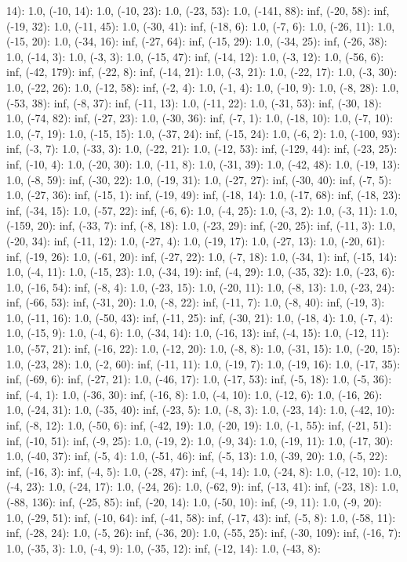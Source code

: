 \documentclass[parskip=half]{scrartcl}
\begin{document}
14): 1.0, (-10, 14): 1.0, (-10, 23): 1.0, (-23, 53): 1.0, (-141, 88): inf, (-20, 58): inf, (-19, 32): 1.0, (-11, 45): 1.0, (-30, 41): inf, (-18, 6): 1.0, (-7, 6): 1.0, (-26, 11): 1.0, (-15, 20): 1.0, (-34, 16): inf, (-27, 64): inf, (-15, 29): 1.0, (-34, 25): inf, (-26, 38): 1.0, (-14, 3): 1.0, (-3, 3): 1.0, (-15, 47): inf, (-14, 12): 1.0, (-3, 12): 1.0, (-56, 6): inf, (-42, 179): inf, (-22, 8): inf, (-14, 21): 1.0, (-3, 21): 1.0, (-22, 17): 1.0, (-3, 30): 1.0, (-22, 26): 1.0, (-12, 58): inf, (-2, 4): 1.0, (-1, 4): 1.0, (-10, 9): 1.0, (-8, 28): 1.0, (-53, 38): inf, (-8, 37): inf, (-11, 13): 1.0, (-11, 22): 1.0, (-31, 53): inf, (-30, 18): 1.0, (-74, 82): inf, (-27, 23): 1.0, (-30, 36): inf, (-7, 1): 1.0, (-18, 10): 1.0, (-7, 10): 1.0, (-7, 19): 1.0, (-15, 15): 1.0, (-37, 24): inf, (-15, 24): 1.0, (-6, 2): 1.0, (-100, 93): inf, (-3, 7): 1.0, (-33, 3): 1.0, (-22, 21): 1.0, (-12, 53): inf, (-129, 44): inf, (-23, 25): inf, (-10, 4): 1.0, (-20, 30): 1.0, (-11, 8): 1.0, (-31, 39): 1.0, (-42, 48): 1.0, (-19, 13): 1.0, (-8, 59): inf, (-30, 22): 1.0, (-19, 31): 1.0, (-27, 27): inf, (-30, 40): inf, (-7, 5): 1.0, (-27, 36): inf, (-15, 1): inf, (-19, 49): inf, (-18, 14): 1.0, (-17, 68): inf, (-18, 23): inf, (-34, 15): 1.0, (-57, 22): inf, (-6, 6): 1.0, (-4, 25): 1.0, (-3, 2): 1.0, (-3, 11): 1.0, (-159, 20): inf, (-33, 7): inf, (-8, 18): 1.0, (-23, 29): inf, (-20, 25): inf, (-11, 3): 1.0, (-20, 34): inf, (-11, 12): 1.0, (-27, 4): 1.0, (-19, 17): 1.0, (-27, 13): 1.0, (-20, 61): inf, (-19, 26): 1.0, (-61, 20): inf, (-27, 22): 1.0, (-7, 18): 1.0, (-34, 1): inf, (-15, 14): 1.0, (-4, 11): 1.0, (-15, 23): 1.0, (-34, 19): inf, (-4, 29): 1.0, (-35, 32): 1.0, (-23, 6): 1.0, (-16, 54): inf, (-8, 4): 1.0, (-23, 15): 1.0, (-20, 11): 1.0, (-8, 13): 1.0, (-23, 24): inf, (-66, 53): inf, (-31, 20): 1.0, (-8, 22): inf, (-11, 7): 1.0, (-8, 40): inf, (-19, 3): 1.0, (-11, 16): 1.0, (-50, 43): inf, (-11, 25): inf, (-30, 21): 1.0, (-18, 4): 1.0, (-7, 4): 1.0, (-15, 9): 1.0, (-4, 6): 1.0, (-34, 14): 1.0, (-16, 13): inf, (-4, 15): 1.0, (-12, 11): 1.0, (-57, 21): inf, (-16, 22): 1.0, (-12, 20): 1.0, (-8, 8): 1.0, (-31, 15): 1.0, (-20, 15): 1.0, (-23, 28): 1.0, (-2, 60): inf, (-11, 11): 1.0, (-19, 7): 1.0, (-19, 16): 1.0, (-17, 35): inf, (-69, 6): inf, (-27, 21): 1.0, (-46, 17): 1.0, (-17, 53): inf, (-5, 18): 1.0, (-5, 36): inf, (-4, 1): 1.0, (-36, 30): inf, (-16, 8): 1.0, (-4, 10): 1.0, (-12, 6): 1.0, (-16, 26): 1.0, (-24, 31): 1.0, (-35, 40): inf, (-23, 5): 1.0, (-8, 3): 1.0, (-23, 14): 1.0, (-42, 10): inf, (-8, 12): 1.0, (-50, 6): inf, (-42, 19): 1.0, (-20, 19): 1.0, (-1, 55): inf, (-21, 51): inf, (-10, 51): inf, (-9, 25): 1.0, (-19, 2): 1.0, (-9, 34): 1.0, (-19, 11): 1.0, (-17, 30): 1.0, (-40, 37): inf, (-5, 4): 1.0, (-51, 46): inf, (-5, 13): 1.0, (-39, 20): 1.0, (-5, 22): inf, (-16, 3): inf, (-4, 5): 1.0, (-28, 47): inf, (-4, 14): 1.0, (-24, 8): 1.0, (-12, 10): 1.0, (-4, 23): 1.0, (-24, 17): 1.0, (-24, 26): 1.0, (-62, 9): inf, (-13, 41): inf, (-23, 18): 1.0, (-88, 136): inf, (-25, 85): inf, (-20, 14): 1.0, (-50, 10): inf, (-9, 11): 1.0, (-9, 20): 1.0, (-29, 51): inf, (-10, 64): inf, (-41, 58): inf, (-17, 43): inf, (-5, 8): 1.0, (-58, 11): inf, (-28, 24): 1.0, (-5, 26): inf, (-36, 20): 1.0, (-55, 25): inf, (-30, 109): inf, (-16, 7): 1.0, (-35, 3): 1.0, (-4, 9): 1.0, (-35, 12): inf, (-12, 14): 1.0, (-43, 8): 
\end{document}
